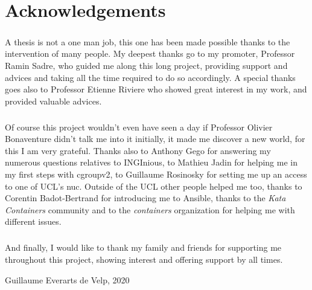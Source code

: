 \chapter*{Acknowledgements}

\paragraph{}A thesis is not a one man job, this one has been made possible thanks to the intervention of many people.  My deepest thanks go to my promoter, Professor Ramin Sadre, who guided me along this long project, providing support and advices and taking all the time required to do so accordingly.  A special thanks goes also to Professor Etienne Riviere who showed great interest in my work, and provided valuable advices.

\paragraph{}Of course this project wouldn't even have seen a day if Professor Olivier Bonaventure didn't talk me into it initially, it made me discover a new world, for this I am very grateful.  Thanks also to Anthony Gego for answering my numerous questions relatives to INGInious, to Mathieu Jadin for helping me in my first steps with cgroupv2, to Guillaume Rosinosky for setting me up an access to one of UCL's nuc.  Outside of the UCL other people helped me too, thanks to Corentin Badot-Bertrand for introducing me to Ansible, thanks to the \textit{Kata Containers} community and to the \textit{containers} organization for helping me with different issues.

\paragraph{}And finally, I would like to thank my family and friends for supporting me throughout this project, showing interest and offering support by all times. 

\begin{flushright}
  Guillaume Everarts de Velp, 2020
\end{flushright}
